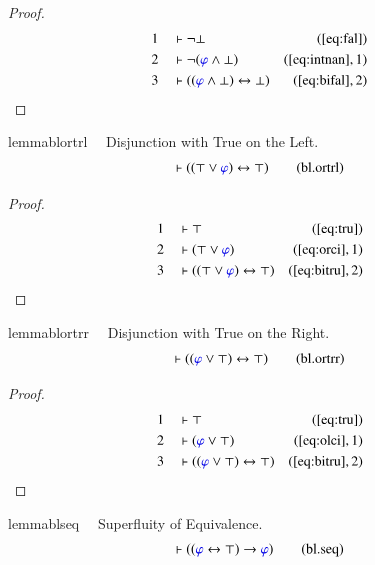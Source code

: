 \begin{proof}
\begin{align}
  1 &&  & \vdash \lnot \bot&(\mbox{\ref{eq:fal}})\notag
  \\ 2 &&  & \vdash \lnot ( \mw{\varphi} \wedge \bot
      )&(\mbox{\ref{eq:intnan}},1)\notag
  \\ 3 &&  & \vdash ( ( \mw{\varphi} \wedge \bot ) \leftrightarrow \bot
      )&(\mbox{\ref{eq:bifal}},2)\notag
\end{align}
\end{proof}

\begin{restatable}{lemma}{blortrl}~~ Disjunction with True on the Left.
\begin{align}
\vdash ( ( \top \vee \mw{\varphi} ) \leftrightarrow \top
    )\label{eq:bl.ortrl}\tag{bl.ortrl}
\end{align}
\end{restatable}

\begin{proof}
\begin{align}
  1 &&  & \vdash \top&(\mbox{\ref{eq:tru}})\notag
  \\ 2 &&  & \vdash ( \top \vee \mw{\varphi} )&(\mbox{\ref{eq:orci}},1)\notag
  \\ 3 &&  & \vdash ( ( \top \vee \mw{\varphi} ) \leftrightarrow \top
      )&(\mbox{\ref{eq:bitru}},2)\notag
\end{align}
\end{proof}

\begin{restatable}{lemma}{blortrr}~~ Disjunction with True on the Right.
\begin{align}
\vdash ( ( \mw{\varphi} \vee \top ) \leftrightarrow \top
    )\label{eq:bl.ortrr}\tag{bl.ortrr}
\end{align}
\end{restatable}

\begin{proof}
\begin{align}
  1 &&  & \vdash \top&(\mbox{\ref{eq:tru}})\notag
  \\ 2 &&  & \vdash ( \mw{\varphi} \vee \top )&(\mbox{\ref{eq:olci}},1)\notag
  \\ 3 &&  & \vdash ( ( \mw{\varphi} \vee \top ) \leftrightarrow \top
      )&(\mbox{\ref{eq:bitru}},2)\notag
\end{align}
\end{proof}

\begin{restatable}{lemma}{blseq}~~ Superfluity of Equivalence.
\begin{align}
\vdash ( ( \mw{\varphi} \leftrightarrow \top ) \rightarrow \mw{\varphi}
    )\label{eq:bl.seq}\tag{bl.seq}
\end{align}
\end{restatable}

